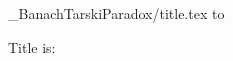 \documentclass{article}
\begin{document}
\newread\file
\newcommand{\readfirstline}[2]{%
  \openin\file=#2
  \read\file to \temp
  \closein\file
  \xdef#1{\temp}%
}

\def\ch01showBanachTarskiParadox{}
\def\ch02showTopologicalInsulators{}

\readfirstline{\testtitle}{01_BanachTarskiParadox/title.tex}

Title is: \testtitle
\end{document}
